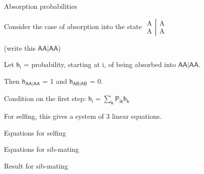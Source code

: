 \documentclass[aspectratio=169,12pt,t]{beamer}
\begin{document}
\begin{frame}[c]{Absorption probabilities}

  \bbi

  \item[] Consider the case of {\vhilit absorption} into the state
$\left.\begin{array}{c} \text{A} \\ \text{A} \end{array} \right| \begin{array}{c} \text{A}
  \\ \text{A} \end{array} $

\hspace*{15mm} {\hilit (write this $\mathsf{AA|AA}$)}

\item[] Let $\mathsf{h_i}$ = probability, starting at i, of being absorbed into $\mathsf{AA|AA}$.

\item[] Then {\hilit $\mathsf{h_{AA|AA}}$ = 1} and
{\hilit $\mathsf{h_{AB|AB}}$ = 0}.

\item[] {\vhilit Condition on the first step:} \hspace*{10mm}
{\hilit
$\mathsf{h_i  = \sum_k  P_{ik} h_k}$}

\item[] For selfing, this gives a system of 3 linear equations.
\ei


\note{
}

\end{frame}



\begin{frame}[c]{Equations for selfing}



\note{
}

\end{frame}



\begin{frame}[c]{Equations for sib-mating}



\note{
}

\end{frame}


\begin{frame}[c]{Result for sib-mating}



\note{
}

\end{frame}
\end{document}

